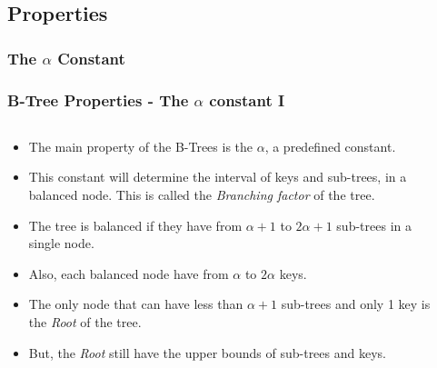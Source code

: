 \documentclass{beamer}
\begin{document}
\begin{frame}
    \subsection{Properties}
    \subsubsection{The \(\alpha\) Constant}
    \frametitle{B-Tree Properties - The \(\alpha\) constant I}
    \begin{columns}
        \begin{column}{\textlecolumn}
            \begin{block}{}
                \begin{itemize}
                    \item The main property of the B-Trees is the \(\alpha\), a predefined constant.
                    \item This constant will determine the interval of keys and sub-trees, in a balanced node. This is called the \emph{Branching factor} of the tree.
                    \item The tree is balanced if they have from \(\alpha + 1\) to \(2\alpha + 1\) sub-trees in a single node.
                    \item Also, each balanced node have from \(\alpha\) to \(2\alpha\) keys.
                    \item The only node that can have less than \(\alpha + 1\) sub-trees and only 1 key is the \emph{Root} of the tree. 
                    \item But, the \emph{Root} still have the upper bounds of sub-trees and keys.
                \end{itemize}
            \end{block}
        \end{column}
        \begin{column}{\textricolumn}
        \end{column}
    \end{columns}
\end{frame}
\end{document}
